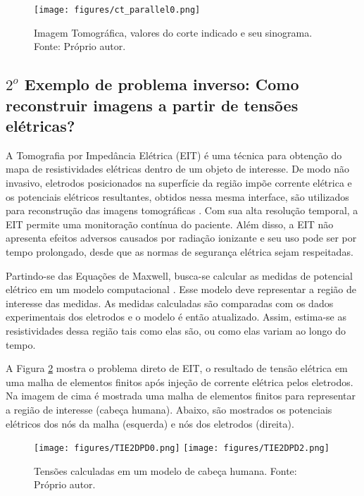     \begin{figure}[H]
        \centering
        \texttt{[image: figures/ct\_parallel0.png]}
        \caption[Imagem Tomográfica, valores do corte indicado e seu sinograma.]{Imagem Tomográfica, valores do corte indicado e seu sinograma. Fonte: Próprio autor.}
        \label{fig:CT2}
    \end{figure}
    


\subsection{$2^o$ Exemplo de problema inverso: Como reconstruir imagens a partir de tensões elétricas?}

A Tomografia por Impedância Elétrica (EIT) é uma técnica para obtenção do mapa de resistividades elétricas dentro de um objeto de interesse. De modo não invasivo, eletrodos posicionados na superfície da região impõe corrente elétrica e os potenciais elétricos resultantes, obtidos nessa mesma interface, são utilizados para reconstrução das imagens tomográficas \cite[pág. 159]{Mueller2012}. Com sua alta resolução temporal, a EIT permite uma monitoração contínua do paciente. Além disso, a EIT não apresenta efeitos adversos causados por radiação ionizante e seu uso pode ser por tempo prolongado, desde que as normas de segurança elétrica sejam respeitadas.  

Partindo-se das Equações de Maxwell, busca-se calcular as medidas de potencial elétrico em um modelo computacional \cite{Holder}. Esse modelo deve representar a região de interesse das medidas. As medidas calculadas são comparadas com os dados experimentais dos eletrodos e o modelo é então atualizado. Assim, estima-se as resistividades dessa região tais como elas são, ou como elas variam ao longo do tempo.

A Figura \ref{fig:TIE2} mostra o problema direto de EIT, o resultado de tensão elétrica em uma malha de elementos finitos após injeção de corrente elétrica pelos eletrodos. Na imagem de cima é mostrada uma malha de elementos finitos para representar a região de interesse (cabeça humana). Abaixo, são mostrados os potenciais elétricos dos nós da malha (esquerda) e nós dos eletrodos (direita). 
       \begin{figure}[H]
        \centering
                \texttt{[image: figures/TIE2DPD0.png]}
        \texttt{[image: figures/TIE2DPD2.png]}
        \caption[Tensões calculadas em um modelo de cabeça humana]{Tensões calculadas em um modelo de cabeça humana. Fonte: Próprio autor.}
        \label{fig:TIE2}
    \end{figure} 

